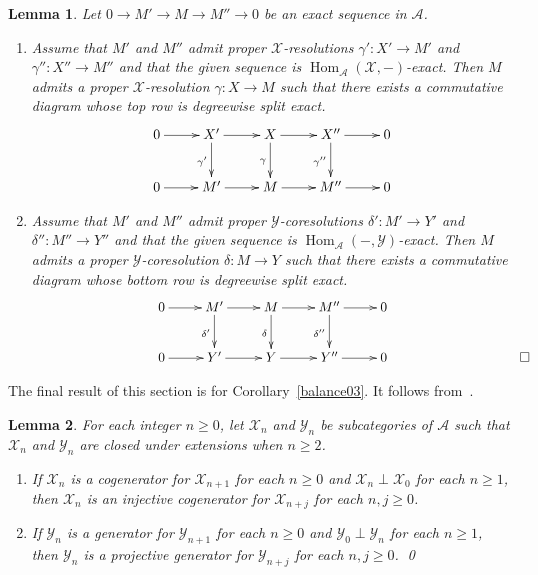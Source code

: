 \documentclass{amsart}
\newtheorem{lem}{Lemma}[section]
\begin{document}
\begin{lem} \label{horseshoe01}
Let $0\to M'\to M\to M''\to 0$ be an exact sequence in ${{\mathcal{{A}}}}$.
\begin{enumerate}[\quad\rm(a)]
\item \label{horseshoe01item1}
Assume that $M'$ and $M''$ 
admit proper ${{\mathcal{{X}}}}$-resolutions $\gamma'\colon X'\to M'$ and 
$\gamma''\colon X''\to M''$
and that the given sequence
is ${{\operatorname{Hom}}_{{\mathcal{{A}}}}}({{\mathcal{{X}}}},-)$-exact. Then $M$
admits a proper ${{\mathcal{{X}}}}$-resolution $\gamma\colon X\to M$
such that there exists a commutative diagram  whose top row is  degreewise
split exact.  
$$
\xymatrix{
0\ar[r] & 
X' \ar[r]\ar[d]_{\gamma'} 
& X \ar[r]\ar[d]_{\gamma} 
& X'' \ar[r]\ar[d]_{\gamma''} & 0 \\
0\ar[r] & M' \ar[r] & M \ar[r] & M'' \ar[r] & 0
}
$$
\item \label{horseshoe01item2}
Assume that $M'$ and $M''$ 
admit proper ${{\mathcal{{Y}}}}$-coresolutions $\delta'\colon M'\to Y'$ and 
$\delta''\colon M''\to Y''$
and that the given sequence
is ${{\operatorname{Hom}}_{{\mathcal{{A}}}}}(-,{{\mathcal{{Y}}}})$-exact. Then $M$ admits a
proper ${{\mathcal{{Y}}}}$-coresolution $\delta\colon M\to Y$
such that there exists a commutative diagram whose bottom row is  degreewise
split exact.
$$
\xymatrix{
&&&
0\ar[r] & M' \ar[r]\ar[d]_{\delta'} & M \ar[r]\ar[d]_{\delta} & M'' \ar[r]\ar[d]_{\delta''} & 0 \\
&&&
0\ar[r] 
& Y' \ar[r]
& Y \ar[r]
& Y'' \ar[r] & 0 &\hspace{6.5mm}& \qed
}
$$
\end{enumerate}
\end{lem}

The final result of this section is for Corollary~\ref{balance03}.
It follows from~\cite[(2.3)]{sather:sgc}.

\begin{lem} \label{cogen01}
For each integer $n{\geqslant} 0$, let ${{\mathcal{{X}}}}_n$ and ${{\mathcal{{Y}}}}_n$ be subcategories of ${{\mathcal{{A}}}}$
such that ${{\mathcal{{X}}}}_n$ and ${{\mathcal{{Y}}}}_n$ are closed under extensions when $n{\geqslant} 2$.
\begin{enumerate}[\quad\rm(a)]
\item \label{cogen01item1}
If ${{\mathcal{{X}}}}_n$ is a cogenerator for ${{\mathcal{{X}}}}_{n+1}$ for each $n{\geqslant} 0$ and ${{\mathcal{{X}}}}_n\perp{{\mathcal{{X}}}}_0$
for each $n{\geqslant} 1$, then ${{\mathcal{{X}}}}_n$ is an injective cogenerator for ${{\mathcal{{X}}}}_{n+j}$ for each $n,j{\geqslant} 0$.\item \label{cogen01item2}
If ${{\mathcal{{Y}}}}_n$ is a generator for ${{\mathcal{{Y}}}}_{n+1}$ for each $n{\geqslant} 0$ and ${{\mathcal{{Y}}}}_0\perp{{\mathcal{{Y}}}}_n$
for each $n{\geqslant} 1$, then ${{\mathcal{{Y}}}}_n$ is a projective generator for ${{\mathcal{{Y}}}}_{n+j}$ for each $n,j{\geqslant} 0$.
\qed
\end{enumerate}
\end{lem}
\end{document}

